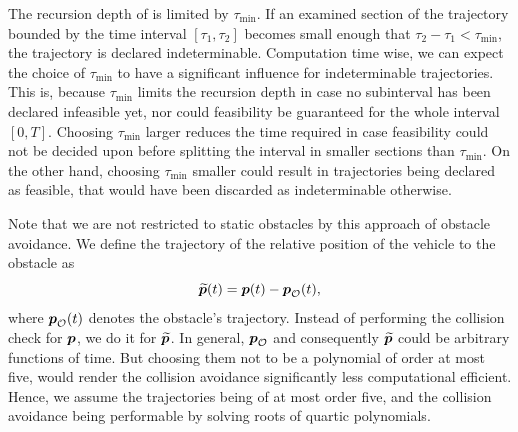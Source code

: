 The recursion depth of  is limited by $\tau_{\min}$.
If an examined section of the trajectory bounded by the time interval $\left[\tau_1, \tau_2\right]$ becomes small enough that $\tau_2 - \tau_1 < \tau_{\min}$, the trajectory is declared indeterminable.
Computation time wise, we can expect the choice of $\tau_{\min}$ to have a significant influence for indeterminable trajectories.
This is, because $\tau_{\min}$ limits the recursion depth in case no subinterval has been declared infeasible yet, nor could feasibility be guaranteed for the whole interval $\left[0, T\right]$.
Choosing $\tau_{\min}$ larger reduces the time required in case feasibility could not be decided upon before splitting the interval in smaller sections than $\tau_{\min}$.
On the other hand, choosing $\tau_{\min}$ smaller could result in trajectories being declared as feasible, that would have been discarded as indeterminable otherwise.

Note that we are not restricted to static obstacles by this approach of obstacle avoidance. We define the trajectory of the relative position of the vehicle to the obstacle as
\begin{equation}
	\mbox{$\widetilde{\bm{p}}$}(t) = \mbox{$\bm{p}$}(t) - \mbox{$\bm{p}$}_{\mathcal{O}}(t)
	,
\end{equation}
where $\mbox{$\bm{p}$}_{\mathcal{O}}(t)$ denotes the obstacle's trajectory. Instead of performing the collision check for $\mbox{$\bm{p}$}$, we do it for $\mbox{$\widetilde{\bm{p}}$}$. In general, $\mbox{$\bm{p}$}_{\mathcal{O}}$ and consequently $\mbox{$\widetilde{\bm{p}}$}$ could be arbitrary functions of time.
But choosing them not to be a polynomial of order at most five, would render the collision avoidance significantly less computational efficient. Hence, we assume the trajectories being of at most order five, and the collision avoidance being performable by solving roots of quartic polynomials.


